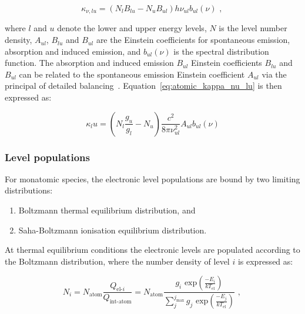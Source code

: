 \begin{equation}
 \kappa_{\nu,lu} = ( N_{l} B_{l u} -N_{u} B_{u l} ) h \nu_{u l} b_{ul}(\nu) \text{ , } \label{eq:atomic_kappa_nu_lu}
\end{equation}

\noindent where $l$ and $u$ denote the lower and upper energy levels, $N$ is the level number density, $A_{ul}$, $B_{lu}$ and $B_{ul}$ are the Einstein coefficients for spontaneous emission, absorption and induced emission, and $b_{ul}(\nu)$ is the spectral distribution function.
The absorption and induced emission $B_{ul}$ Einstein coefficients $B_{lu}$ and $B_{ul}$ can be related to the spontaneous emission Einstein coefficient $A_{ul}$ via the principal of detailed balancing~\cite{ZR}.
Equation~\ref{eq:atomic_kappa_nu_lu} is then expressed as:

\begin{equation}
 \kappa_lu = \left ( N_l \frac{g_u}{g_l} - N_u \right ) \frac{c^2}{8 \pi \nu_{ul}^2} A_{ul} b_{ul}(\nu)
\end{equation}

\subsubsection{Level populations}

For monatomic species, the electronic level populations are bound by two limiting distributions:

\begin{enumerate}
 \item Boltzmann thermal equilibrium distribution, and
 \item Saha-Boltzmann ionisation equilibrium distribution.
\end{enumerate}

At thermal equilibrium conditions the electronic levels are populated according to the Boltzmann distribution, where the number density of level $i$ is expressed as:

\begin{equation}
 N_i = N_\text{atom} \frac{ Q_{\text{el-}i} }{ Q_\text{int-atom} } = N_\text{atom} \frac{g_i \text{~exp} \left ( \frac{-E_i}{kT_\text{el}} \right )}{\sum_j^{j_\text{max}} g_j \text{~exp} \left ( \frac{-E_j}{kT_\text{el}} \right )} \text{ , } \label{eq:atom_boltz}
\end{equation}

